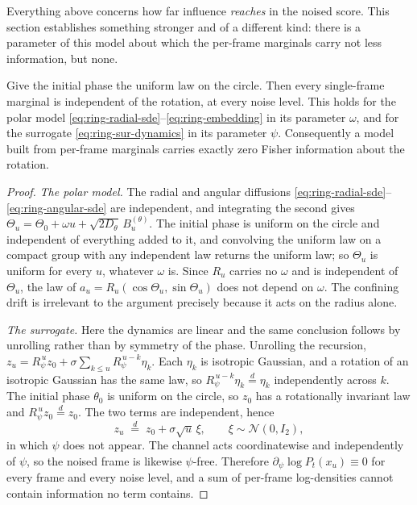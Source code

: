 Everything above concerns how far influence \emph{reaches} in the noised score.
This section establishes something stronger and of a different kind: there is a
parameter of this model about which the per-frame marginals carry not less
information, but none.

\begin{theorem}\label{thm:ring-blindness}
Give the initial phase the uniform law on the circle. Then every single-frame
marginal is independent of the rotation, at every noise level. This holds for
the polar model
\eqref{eq:ring-radial-sde}--\eqref{eq:ring-embedding} in its parameter
$\omega$, and for the surrogate \eqref{eq:ring-sur-dynamics} in its parameter
$\psi$. Consequently a model built from per-frame marginals carries exactly
zero Fisher information about the rotation.
\end{theorem}

\begin{proof}
\emph{The polar model.} The radial and angular diffusions
\eqref{eq:ring-radial-sde}--\eqref{eq:ring-angular-sde} are independent, and
integrating the second gives
$\Theta_u = \Theta_0 + \omega u + \sqrt{2D_\theta}\, B^{(\theta)}_u$. The initial
phase is uniform on the circle and independent of everything added to it, and
convolving the uniform law on a compact group with any independent law returns
the uniform law; so $\Theta_u$ is uniform for every $u$, whatever $\omega$ is.
Since $R_u$ carries no $\omega$ and is independent of $\Theta_u$, the law of
$a_u = R_u(\cos\Theta_u, \sin\Theta_u)$ does not depend on $\omega$. The
confining drift is irrelevant to the argument precisely because it acts on the
radius alone.

\emph{The surrogate.} Here the dynamics are linear and the same conclusion
follows by unrolling rather than by symmetry of the phase. Unrolling the
recursion,
$z_u = R_\psi^{\,u} z_0 + \sigma\sum_{k\le u} R_\psi^{\,u-k}\eta_k$. Each
$\eta_k$ is isotropic Gaussian, and a rotation of an isotropic Gaussian has the
same law, so $R_\psi^{\,u-k}\eta_k \stackrel{d}{=} \eta_k$ independently across $k$. The
initial phase $\theta_0$ is uniform on the circle, so $z_0$ has a rotationally
invariant law and $R_\psi^{\,u} z_0 \stackrel{d}{=} z_0$. The two terms are independent,
hence
\begin{equation}
  z_u \;\stackrel{d}{=}\; z_0 + \sigma\sqrt{u}\,\xi,
  \qquad \xi \sim \mathcal{N}(0, I_2),
  \label{eq:ring-blind-law}
\end{equation}
in which $\psi$ does not appear. The channel acts coordinatewise and
independently of $\psi$, so the noised frame is likewise $\psi$-free. Therefore
$\partial_\psi \log P_t(x_u) \equiv 0$ for every frame and every noise level,
and a sum of per-frame log-densities cannot contain information no term
contains.
\end{proof}

